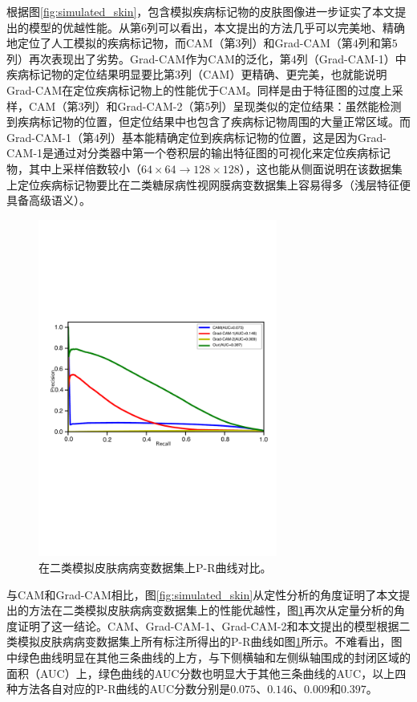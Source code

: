 根据图\ref{fig:simulated_skin}，包含模拟疾病标记物的皮肤图像进一步证实了本文提出的模型的优越性能。从第$6$列可以看出，本文提出的方法几乎可以完美地、精确地定位了人工模拟的疾病标记物，而CAM（第$3$列）和Grad-CAM（第$4$列和第$5$列）再次表现出了劣势。Grad-CAM作为CAM的泛化，第$4$列（Grad-CAM-1）中疾病标记物的定位结果明显要比第$3$列（CAM）更精确、更完美，也就能说明Grad-CAM在定位疾病标记物上的性能优于CAM。同样是由于特征图的过度上采样，CAM（第$3$列）和Grad-CAM-2（第$5$列）呈现类似的定位结果：虽然能检测到疾病标记物的位置，但定位结果中也包含了疾病标记物周围的大量正常区域。而Grad-CAM-1（第$4$列）基本能精确定位到疾病标记物的位置，这是因为Grad-CAM-1是通过对分类器中第一个卷积层的输出特征图的可视化来定位疾病标记物，其中上采样倍数较小（$64\times 64\rightarrow 128\times 128$），这也能从侧面说明在该数据集上定位疾病标记物要比在二类糖尿病性视网膜病变数据集上容易得多（浅层特征便具备高级语义）。
\begin{figure}[h]
	\centering
	\includegraphics[width=0.7\textwidth]{figure/pr_curve_skin_image/pr_curve.pdf}
	\caption[在二类模拟皮肤病病变数据集上P-R曲线对比]{在二类模拟皮肤病病变数据集上P-R曲线对比。}
	\label{fig:simulated_skin_pr_curve}
\end{figure}

与CAM和Grad-CAM相比，图\ref{fig:simulated_skin}从定性分析的角度证明了本文提出的方法在二类模拟皮肤病病变数据集上的性能优越性，图\ref{fig:simulated_skin_pr_curve}再次从定量分析的角度证明了这一结论。CAM、Grad-CAM-1、Grad-CAM-2和本文提出的模型根据二类模拟皮肤病病变数据集上所有标注所得出的P-R曲线如图\ref{fig:simulated_skin_pr_curve}所示。不难看出，图中绿色曲线明显在其他三条曲线的上方，与下侧横轴和左侧纵轴围成的封闭区域的面积（AUC）上，绿色曲线的AUC分数也明显大于其他三条曲线的AUC，以上四种方法各自对应的P-R曲线的AUC分数分别是$0.075$、$0.146$、$0.009$和$0.397$。

